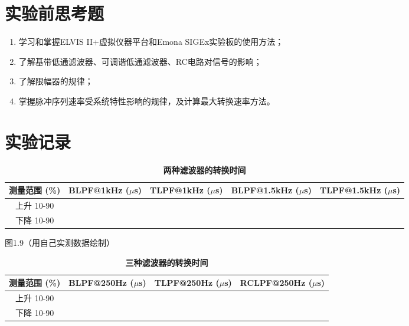 \documentclass{sasreport}
\begin{document}
\maketitle

\section{实验前思考题}
\begin{enumerate}[(1)]
    \item 学习和掌握ELVIS II+虚拟仪器平台和Emona SIGEx实验板的使用方法；
    \item 了解基带低通滤波器、可调谐低通滤波器、RC电路对信号的影响；
    \item 了解限幅器的规律；
    \item 掌握脉冲序列速率受系统特性影响的规律，及计算最大转换速率方法。
\end{enumerate}

\section{实验记录}
\begin{table}[H]
    \centering
    \caption{\bfseries 两种滤波器的转换时间}
    \large
    \begin{tabularx}{\textwidth}{|c|Y|Y|Y|Y|}
        \hline
        测量范围 (\%) & BLPF@1kHz ($\mu$s) & TLPF@1kHz ($\mu$s) & BLPF@1.5kHz ($\mu$s) & TLPF@1.5kHz ($\mu$s) \\\hline
        上升 10-90  &                    &                    &                      &                      \\\hline
        下降 10-90  &                    &                    &                      &                      \\\hline
    \end{tabularx}
\end{table}

\begin{center}
    图1.9（用自己实测数据绘制）
\end{center}

\begin{table}[H]
    \centering
    \caption{\bfseries 三种滤波器的转换时间}
    \large
    \begin{tabularx}{\textwidth}{|c|Y|Y|Y|}
        \hline
        测量范围 (\%) & BLPF@250Hz ($\mu$s) & TLPF@250Hz ($\mu$s) & RCLPF@250Hz ($\mu$s) \\\hline
        上升 10-90  &                     &                     &                      \\\hline
        下降 10-90  &                     &                     &                      \\\hline
    \end{tabularx}
\end{table}
\end{document}
